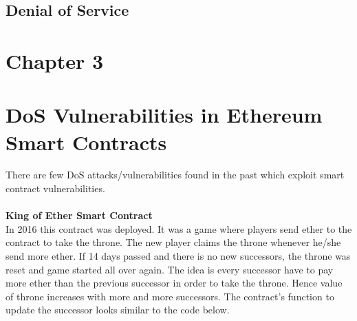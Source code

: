 \documentclass{article}
\begin{document}
\subsection*{Denial of Service}


\newpage
\section*{Chapter 3}

\section*{DoS Vulnerabilities in Ethereum Smart Contracts}
There are few DoS attacks/vulnerabilities found in the past which exploit smart contract vulnerabilities.\\
\\
\textbf{King of Ether Smart Contract}\\
In 2016 this contract was deployed. It was a game where players send ether to the contract to take the throne. The new player claims the throne whenever he/she send more ether. If 14 days passed and there is no new successors, the throne was reset and game started all over again. The idea is every successor have to pay more ether than the previous successor in order to take the throne. Hence value of throne increases with more and more successors. The contract's function to update the successor looks similar to the code below.
\end{document}
